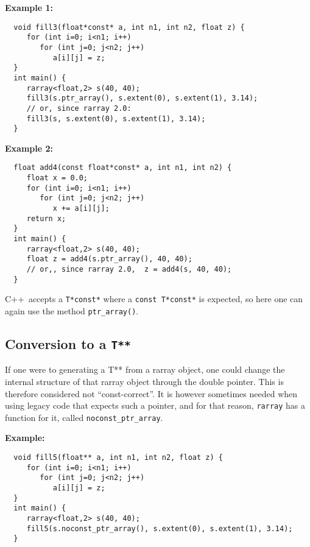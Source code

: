 \documentclass[11pt,twoside]{article}
\newcommand{\cxx}{C{++}}
\begin{document}
\noindent
{\bf Example 1:}
\vspace{-5pt}\begin{framed}\vspace{-14pt}%
\begin{verbatim}
  void fill3(float*const* a, int n1, int n2, float z) {
     for (int i=0; i<n1; i++)
        for (int j=0; j<n2; j++)
           a[i][j] = z;
  }
  int main() {
     rarray<float,2> s(40, 40);
     fill3(s.ptr_array(), s.extent(0), s.extent(1), 3.14);
     // or, since rarray 2.0:
     fill3(s, s.extent(0), s.extent(1), 3.14);
  }
\end{verbatim}%
\vspace{-14pt}\end{framed}\vspace{-8pt}

\noindent
{\bf Example 2:}
\vspace{-5pt}\begin{framed}\vspace{-14pt}%
\begin{verbatim}
  float add4(const float*const* a, int n1, int n2) {
     float x = 0.0;
     for (int i=0; i<n1; i++)
        for (int j=0; j<n2; j++)
           x += a[i][j];
     return x;
  }
  int main() {
     rarray<float,2> s(40, 40);
     float z = add4(s.ptr_array(), 40, 40);
     // or,, since rarray 2.0,  z = add4(s, 40, 40);
  }
\end{verbatim}%
\vspace{-14pt}
\end{framed}

\noindent
\cxx\ accepts a \texttt{T*const*} where a \texttt{const T*const*} is expected, so here one can again use the method \texttt{ptr\_array()}.


\subsection{Conversion to a {\tt T**}}

\noindent
If one were to generating a T** from a rarray object, one could change
the internal structure of that rarray object through the double
pointer.  This is therefore considered not ``const-correct''.  It is
however sometimes needed when using legacy code that expects such a
pointer, and for that reason, \texttt{rarray} has a function for it, called \texttt{noconst\_ptr\_array}. 

\noindent
{\bf Example:}
\vspace{-5pt}\begin{framed}\vspace{-14pt}%
\begin{verbatim}
  void fill5(float** a, int n1, int n2, float z) {
     for (int i=0; i<n1; i++)
        for (int j=0; j<n2; j++)
           a[i][j] = z;
  }
  int main() {
     rarray<float,2> s(40, 40);
     fill5(s.noconst_ptr_array(), s.extent(0), s.extent(1), 3.14);
  }
\end{verbatim}%
\vspace{-14pt}
\end{framed}
\end{document}
